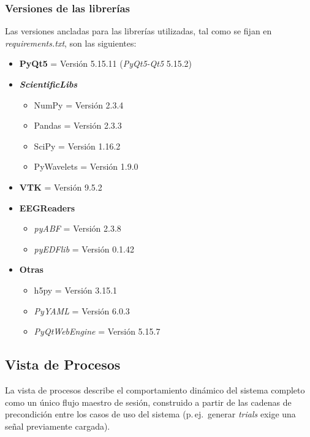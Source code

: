 \documentclass[12pt,letterpaper,oneside]{article}
\DeclareRobustCommand{\_}{\textunderscore\allowbreak}
\begin{document}
\subsubsection{Versiones de las librer\'ias}

Las versiones ancladas para las librer\'ias utilizadas, tal como se fijan en \textit{requirements.txt}, son las siguientes:

\begin{itemize}
    \item \textbf{PyQt5} = Versi\'on 5.15.11 (\textit{PyQt5-Qt5} 5.15.2)
    \item \textbf{\textit{ScientificLibs}}
    \begin{itemize}
        \item NumPy = Versi\'on 2.3.4
        \item Pandas = Versi\'on 2.3.3
        \item SciPy = Versi\'on 1.16.2
        \item PyWavelets = Versi\'on 1.9.0
    \end{itemize}
    \item \textbf{VTK} = Versi\'on 9.5.2
    \item \textbf{EEGReaders}
    \begin{itemize}
        \item \textit{pyABF} = Versi\'on 2.3.8
        \item \textit{pyEDFlib} = Versi\'on 0.1.42
    \end{itemize}
    \item \textbf{Otras}
    \begin{itemize}
        \item h5py = Versi\'on 3.15.1
        \item \textit{PyYAML} = Versi\'on 6.0.3
        \item \textit{PyQtWebEngine} = Versi\'on 5.15.7
    \end{itemize}
\end{itemize}

\subsection{Vista de Procesos}

La vista de procesos describe el comportamiento din\'amico del sistema completo como un \'unico flujo maestro de sesi\'on, construido a partir de las cadenas de precondici\'on entre los casos de uso del sistema (p.\,ej.\ generar \textit{trials} exige una se\~nal previamente cargada).
\end{document}
